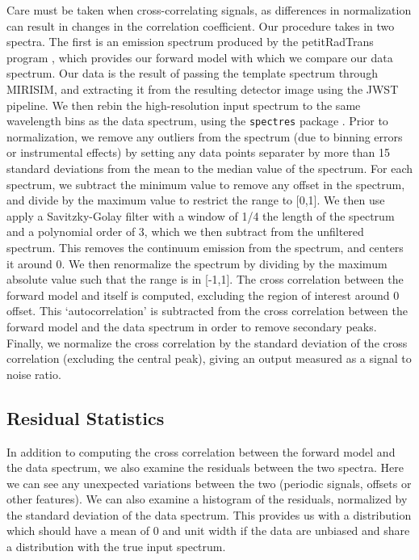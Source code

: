 Care must be taken when cross-correlating signals, as differences in normalization can result in changes in the correlation coefficient. 
Our procedure takes in two spectra. 
The first is an emission spectrum produced by the petitRadTrans program \cite{Molliere2019}, which provides our forward model with which we compare our data spectrum.
Our data is the result of passing the template spectrum through MIRISIM, and extracting it from the resulting detector image using the JWST pipeline.
We then rebin the high-resolution input spectrum to the same wavelength bins as the data spectrum, using the \verb|spectres| package \cite{}.
Prior to normalization, we remove any outliers from the spectrum (due to binning errors or instrumental effects) by setting any data points separater by more than 15 standard deviations from the mean to the median value of the spectrum.
For each spectrum, we subtract the minimum value to remove any offset in the spectrum, and divide by the maximum value to restrict the range to [0,1]. 
We then use apply a Savitzky-Golay filter with a window of 1/4 the length of the spectrum and a polynomial order of 3, which we then subtract from the unfiltered spectrum. 
This removes the continuum emission from the spectrum, and centers it around 0.
We then renormalize the spectrum by dividing by the maximum absolute value such that the range is in [-1,1]. 
The cross correlation between the forward model and itself is computed, excluding the region of interest around 0 offset. 
This `autocorrelation' is subtracted from the cross correlation between the forward model and the data spectrum in order to remove secondary peaks.
Finally, we normalize the cross correlation by the standard deviation of the cross correlation (excluding the central peak), giving an output measured as a signal to noise ratio.

\subsection{Residual Statistics}
In addition to computing the cross correlation between the forward model and the data spectrum, we also examine the residuals between the two spectra.
Here we can see any unexpected variations between the two (periodic signals, offsets or other features).
We can also examine a histogram of the residuals, normalized by the standard deviation of the data spectrum.
This provides us with a  distribution which should have a mean of 0 and unit width if the data are unbiased and share a distribution with the true input spectrum.
